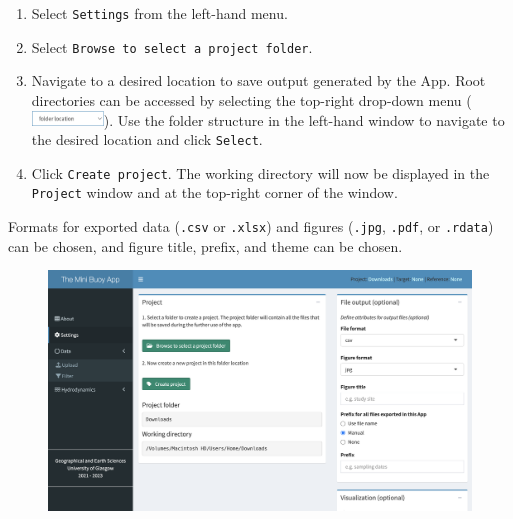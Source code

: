 \documentclass[
  letterpaper,
  DIV=11,
  numbers=noendperiod]{scrreprt}
\providecommand{\tightlist}{%
  \setlength{\itemsep}{0pt}\setlength{\parskip}{0pt}}\usepackage{longtable,booktabs,array}
\begin{document}
\begin{enumerate}
\def\labelenumi{\arabic{enumi}.}
\tightlist
\item
  Select \texttt{Settings} from the left-hand menu.
\item
  Select \texttt{Browse\ to\ select\ a\ project\ folder}.
\item
  Navigate to a desired location to save output generated by the App.
  Root directories can be accessed by selecting the top-right drop-down
  menu
  (\includegraphics[width=0.15\textwidth,height=\textheight]{chapters/figs/NavigatorIcon.png}).
  Use the folder structure in the left-hand window to navigate to the
  desired location and click \texttt{Select}.
\item
  Click \texttt{Create\ project}. The working directory will now be
  displayed in the \texttt{Project} window and at the top-right corner
  of the window.
\end{enumerate}

\begin{tcolorbox}[enhanced jigsaw, bottomrule=.15mm, leftrule=.75mm, bottomtitle=1mm, breakable, opacityback=0, colback=white, left=2mm, toprule=.15mm, opacitybacktitle=0.6, arc=.35mm, colframe=quarto-callout-tip-color-frame, toptitle=1mm, titlerule=0mm, colbacktitle=quarto-callout-tip-color!10!white, coltitle=black, title=\textcolor{quarto-callout-tip-color}{\faLightbulb}\hspace{0.5em}{Tip}, rightrule=.15mm]

Formats for exported data (\texttt{.csv} or \texttt{.xlsx}) and figures
(\texttt{.jpg}, \texttt{.pdf}, or \texttt{.rdata}) can be chosen, and
figure title, prefix, and theme can be chosen.

\end{tcolorbox}

\begin{figure}

{\centering \includegraphics[width=1\textwidth,height=\textheight]{chapters/figs/Settings.png}

}

\end{figure}
\end{document}
